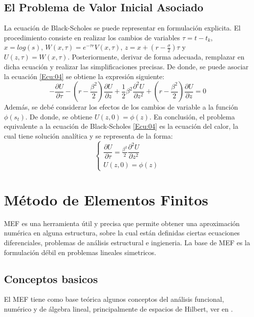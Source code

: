 \documentclass[12pt]{article}
\begin{document}
\subsection{El Problema de Valor Inicial Asociado}
La ecuación de Black-Scholes se puede representar en formulación explicita. El procedimiento consiste en realizar los cambios de variables $\tau = t-t_k $, $x = log(s) $, $W(x,\tau) = e^{-\tau r}V(x,\tau) $, $z = x + (r-\frac{\sigma}{2})\tau$ y $U(z,\tau) = W(x,\tau) $. Posteriormente, derivar de forma adecuada, remplazar en dicha ecuación y realizar las simplificaciones precisas. De donde, se puede asociar la ecuación \eqref{Ecu:04} se obtiene la expresión siguiente:
\begin{equation*} 
-\dfrac{\partial{U}}{\partial{\tau}} - (r-\frac{\beta^2}{2})\dfrac{\partial{U}}{\partial{z}} + \frac{1}{2}\beta^2\dfrac{\partial^2{U}}{\partial{z^2}} +
(r-\frac{\beta^2}{2})\dfrac{\partial{U}}{\partial{z}} = 0
\end{equation*}
Además, se debé considerar los efectos de los cambios de variable a la función $\phi(s_t)$. De donde, se obtiene $U(z,0) = \phi(z)$. En conclusión, el problema equivalente a la ecuación de Black-Scholes \eqref{Ecu:04} es la ecuación del calor, la cual tiene solución analítica y se representa de la forma:   
\begin{equation} 
\left\{
\begin{array}{c}
\dfrac{\partial{U}}{\partial{\tau}} = \frac{\beta^2}{2}\dfrac{\partial^2{U}}{\partial{z^2}}\\[0.5cm]
U(z,0) = \phi(z)
\label{Ecu:06}
\end{array} \right.  
\end{equation}
 \section{Método de Elementos Finitos}\label{Sec:02}
MEF es una herramienta útil y precisa que permite obtener una aproximación numérica en alguna estructura, sobre la cual están definidas ciertas ecuaciones diferenciales, problemas de análisis estructural e ingieneria. La base de MEF es la formulación débil en problemas lineales simetricos.
\subsection{Conceptos basicos}
El MEF tiene como base teórica algunos conceptos del análisis funcional, numérico y de álgebra lineal, principalmente de espacios de Hilbert, ver en \cite{Lib04}. 
\end{document}
